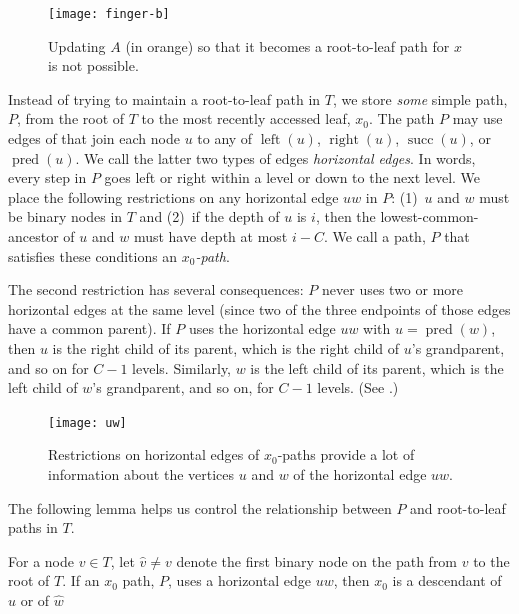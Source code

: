 \documentclass{patmorin}
\DeclareMathOperator{\scc}{succ}
\DeclareMathOperator{\pred}{pred}
\DeclareMathOperator{\lft}{left}
\DeclareMathOperator{\rght}{right}
\begin{document}
\begin{figure}
  \begin{center}
    \texttt{[image: finger-b]}
  \end{center}
  \caption{Updating $A$ (in orange) so that it becomes a root-to-leaf path
      for $x$ is not possible.}
\end{figure}

Instead of trying to maintain a root-to-leaf path in $T$, we store
\emph{some} simple path, $P$, from the root of $T$ to the most recently
accessed leaf, $x_0$.  The path $P$ may use edges of that join each node
$u$ to any of $\lft(u)$, $\rght(u)$, $\scc(u)$, or $\pred(u)$. We call
the latter two types of edges \emph{horizontal edges}.  In words, every
step in $P$ goes left or right within a level or down to the next level.
We place the following restrictions on any horizontal edge $uw$ in $P$:
(1)~$u$ and $w$ must be binary nodes in $T$ and (2)~if the depth of $u$
is $i$, then the lowest-common-ancestor of $u$ and $w$ must have depth
at most $i-C$.  We call a path, $P$ that satisfies these conditions an
\emph{$x_0$-path}.

The second restriction has several consequences: $P$ never uses two or
more horizontal edges at the same level (since two of the three endpoints
of those edges have a common parent).  If $P$ uses the horizontal edge
$uw$ with $u=\pred(w)$, then $u$ is the right child of its parent, which
is the right child of $u$'s grandparent, and so on for $C-1$ levels.
Similarly, $w$ is the left child of its parent, which is the left child
of $w$'s grandparent, and so on, for $C-1$ levels. (See .)

\begin{figure}
  \begin{center}
    \texttt{[image: uw]}
  \end{center}
  \caption{Restrictions on horizontal edges of $x_0$-paths provide a
  lot of information about the vertices $u$ and $w$ of the horizontal
  edge $uw$.} 
\end{figure}

The following lemma helps us control the relationship between $P$ and
root-to-leaf paths in $T$.

\begin{lem}
  For a node $v\in T$, let $\hat v\neq v$ denote the first binary node on
  the path from $v$ to the root of $T$.  If an $x_0$ path, $P$,
  uses a horizontal edge $uw$, then $x_0$ is a descendant of $\hat u$
  or of $\hat w$
\end{lem}
\end{document}
